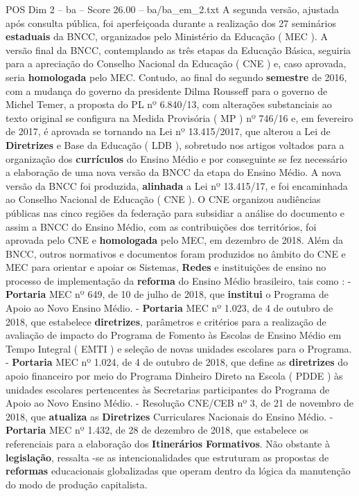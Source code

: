 \begin{textsample}{POS Dim 2 – ba – Score 26.00 – ba/ba\_em\_2.txt}
A segunda versão, ajustada após consulta pública, foi aperfeiçoada durante a realização dos 27 seminários \textbf{estaduais} da BNCC, organizados pelo Ministério da Educação ( MEC ).
A versão final da BNCC, contemplando as três etapas da Educação Básica, seguiria para a apreciação do Conselho Nacional da Educação ( CNE ) e, caso aprovada, seria \textbf{homologada} pelo MEC.
Contudo, ao final do segundo \textbf{semestre} de 2016, com a mudança do governo da presidente Dilma Rousseff para o governo de Michel Temer, a proposta do PL nº 6.840/13, com alterações substanciais ao texto original se configura na Medida Provisória ( MP ) nº 746/16 e, em fevereiro de 2017, é aprovada se tornando na Lei nº 13.415/2017, que alterou a Lei de \textbf{Diretrizes} e Base da Educação ( LDB ), sobretudo nos artigos voltados para a organização dos \textbf{currículos} do Ensino Médio e por conseguinte se fez necessário a elaboração de uma nova versão da BNCC da etapa do Ensino Médio.
A nova versão da BNCC foi produzida, \textbf{alinhada} a Lei nº 13.415/17, e foi encaminhada ao Conselho Nacional de Educação ( CNE ).
O CNE organizou audiências públicas nas cinco regiões da federação para subsidiar a análise do documento e assim a BNCC do Ensino Médio, com as contribuições dos territórios, foi aprovada pelo CNE e \textbf{homologada} pelo MEC, em dezembro de 2018.
Além da BNCC, outros normativos e documentos foram produzidos no âmbito do CNE e MEC para orientar e apoiar os Sistemas, \textbf{Redes} e instituições de ensino no processo de implementação da \textbf{reforma} do Ensino Médio brasileiro, tais como : - \textbf{Portaria} MEC nº 649, de 10 de julho de 2018, que \textbf{institui} o Programa de Apoio ao Novo Ensino Médio. - \textbf{Portaria} MEC nº 1.023, de 4 de outubro de 2018, que estabelece \textbf{diretrizes}, parâmetros e critérios para a realização de avaliação de impacto do Programa de Fomento às Escolas de Ensino Médio em Tempo Integral ( EMTI ) e seleção de novas unidades escolares para o Programa. - \textbf{Portaria} MEC nº 1.024, de 4 de outubro de 2018, que define as \textbf{diretrizes} do apoio financeiro por meio do Programa Dinheiro Direto na Escola ( PDDE ) às unidades escolares pertencentes às Secretarias participantes do Programa de Apoio ao Novo Ensino Médio. - Resolução CNE/CEB nº 3, de 21 de novembro de 2018, que \textbf{atualiza} as \textbf{Diretrizes} Curriculares Nacionais do Ensino Médio. - \textbf{Portaria} MEC nº 1.432, de 28 de dezembro de 2018, que estabelece os referenciais para a elaboração dos \textbf{Itinerários} \textbf{Formativos}.
Não obstante à \textbf{legislação}, ressalta -se as intencionalidades que estruturam as propostas de \textbf{reformas} educacionais globalizadas que operam dentro da lógica da manutenção do modo de produção capitalista.

\end{textsample}
